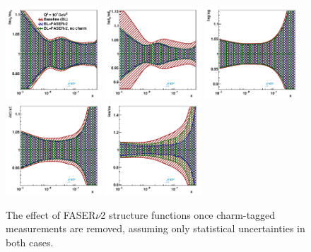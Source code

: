 \begin{figure}[t]
\centering
\includegraphics[width=0.32\textwidth]{plots/nuclear_fasernu2/inclusive-only_vs_inclusive+charm/statOnly_FASERv2_q2_10000_pdf_uv_ratio.pdf}
\includegraphics[width=0.32\textwidth]{plots/nuclear_fasernu2/inclusive-only_vs_inclusive+charm/statOnly_FASERv2_q2_10000_pdf_dv_ratio.pdf}
\includegraphics[width=0.32\textwidth]{plots/nuclear_fasernu2/inclusive-only_vs_inclusive+charm/statOnly_FASERv2_q2_10000_pdf_g_ratio.pdf}\\
\includegraphics[width=0.32\textwidth]{plots/nuclear_fasernu2/inclusive-only_vs_inclusive+charm/statOnly_FASERv2_q2_10000_pdf_Sea_ratio.pdf}
\includegraphics[width=0.32\textwidth]{plots/nuclear_fasernu2/inclusive-only_vs_inclusive+charm/statOnly_FASERv2_q2_10000_pdf_s_ratio.pdf}
\caption{The effect of FASER$\nu$2 structure functions once charm-tagged measurements are removed, assuming only statistical uncertainties in both cases.
}
\label{fig:profiling_charm_nuclear}
\end{figure}

